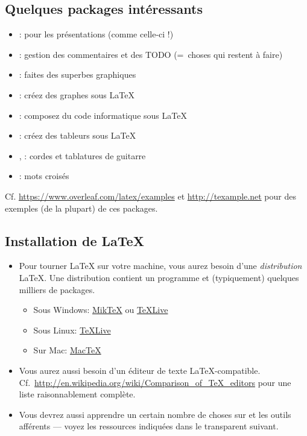 \documentclass{beamer}
\begin{document}
\subsection{Quelques packages intéressants}
\begin{frame}{\insertsubsection}
\begin{itemize}
\item {}: pour les présentations (comme celle-ci !)
\item {}: gestion des commentaires et des TODO (=~choses qui restent à faire)
\item {}: faites des superbes graphiques
\item {}: créez des graphes sous \LaTeX
\item {}: composez du code informatique sous \LaTeX
\item {}: créez des tableurs sous \LaTeX
\item {}, : cordes et tablatures de guitarre
\item {}: mots croisés
\end{itemize}
Cf. \url{https://www.overleaf.com/latex/examples} et \url{http://texample.net}
pour des exemples (de la plupart) de ces packages.
\end{frame}

\subsection{Installation de \LaTeX{}}
\begin{frame}{\insertsubsection}
\begin{itemize}
\item Pour tourner \LaTeX{} sur votre machine, vous aurez besoin d'une
\emph{distribution} \LaTeX{}. Une distribution contient un programme  et
(typiquement) quelques milliers de packages.
\begin{itemize}
\item Sous Windows: \href{http://miktex.org/}{Mik\TeX} ou \href{http://tug.org/texlive/}{\TeX Live}
\item Sous Linux: \href{http://tug.org/texlive/}{\TeX Live}
\item Sur Mac: \href{http://tug.org/mactex/}{Mac\TeX}
\end{itemize}
\item Vous aurez aussi besoin d'un éditeur de texte \LaTeX{}-compatible. Cf.~\url{http://en.wikipedia.org/wiki/Comparison_of_TeX_editors} pour une liste raisonnablement complète.
\item Vous devrez aussi apprendre un certain nombre de choses sur  et les outils afférents --- voyez les ressources indiquées dans le transparent suivant.
\end{itemize}
\end{frame}
\end{document}
